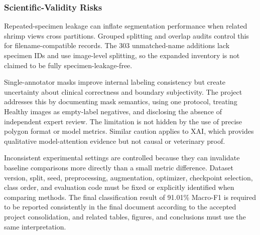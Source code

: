 \documentclass[12pt,a4paper]{report}
\begin{document}
\subsubsection{Scientific-Validity Risks}
Repeated-specimen leakage can inflate segmentation performance when related shrimp views cross partitions. Grouped splitting and overlap audits control this for filename-compatible records. The 303 unmatched-name additions lack specimen IDs and use image-level splitting, so the expanded inventory is not claimed to be fully specimen-leakage-free.\par
Single-annotator masks improve internal labeling consistency but create uncertainty about clinical correctness and boundary subjectivity. The project addresses this by documenting mask semantics, using one protocol, treating Healthy images as empty-label negatives, and disclosing the absence of independent expert review. The limitation is not hidden by the use of precise polygon format or model metrics. Similar caution applies to XAI, which provides qualitative model-attention evidence but not causal or veterinary proof.\par
Inconsistent experimental settings are controlled because they can invalidate baseline comparisons more directly than a small metric difference. Dataset version, split, seed, preprocessing, augmentation, optimizer, checkpoint selection, class order, and evaluation code must be fixed or explicitly identified when comparing methods. The final classification result of 91.01\% Macro-F1 is required to be reported consistently in the final document according to the accepted project consolidation, and related tables, figures, and conclusions must use the same interpretation.\par
\end{document}
